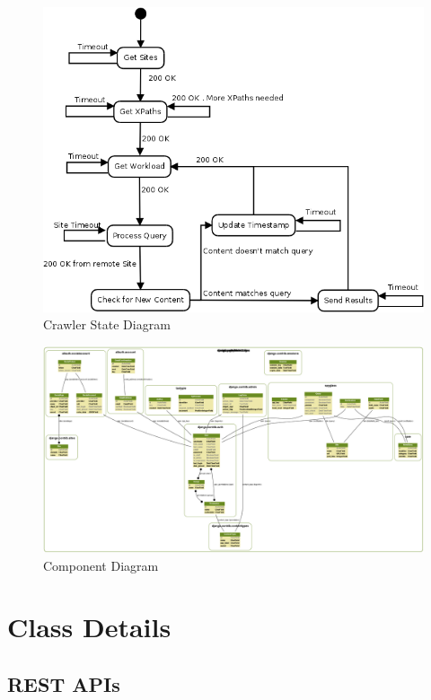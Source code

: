     \begin{figure}[h]
        \includegraphics[width=\textwidth]{files/state.jpg}
        \caption{Crawler State Diagram}
    \end{figure}

    \begin{figure}[h]
        \includegraphics[angle=90,height=\textheight]{files/spyglass.png}
        \caption{Component Diagram}
    \end{figure}

\chapter{Class Details}
    \section{REST APIs}
    \inputminted[linenos,fontsize=\scriptsize,frame=leftline]{text}{files/api}

